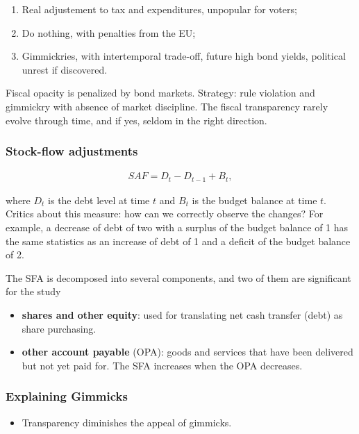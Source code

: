 \begin{enumerate}
\def\labelenumi{\arabic{enumi}.}
\itemsep1pt\parskip0pt
\item
  Real adjustement to tax and expenditures, unpopular for voters;
\item
  Do nothing, with penalties from the EU;
\item
  Gimmickries, with intertemporal trade-off, future high bond yields,
  political unrest if discovered.
\end{enumerate}

Fiscal opacity is penalized by bond markets. Strategy: rule violation
and gimmickry with absence of market discipline. The fiscal transparency
rarely evolve through time, and if yes, seldom in the right direction.

\subsubsection{Stock-flow adjustments}\label{stock-flow-adjustments}

\begin{align*}
 SAF=  D_t - D_{t-1} + B_t,
\end{align*}

where \(D_t\) is the debt level at time \(t\) and \(B_t\) is the budget
balance at time \(t\). Critics about this measure: how can we correctly
observe the changes? For example, a decrease of debt of two with a
surplus of the budget balance of 1 has the same statistics as an
increase of debt of 1 and a deficit of the budget balance of 2.

The SFA is decomposed into several components, and two of them are
significant for the study

\begin{itemize}
\item
  \textbf{shares and other equity}: used for translating net cash
  transfer (debt) as share purchasing.
\item
  \textbf{other account payable} (OPA): goods and services that have
  been delivered but not yet paid for. The SFA increases when the OPA
  decreases.
\end{itemize}

\subsubsection{Explaining Gimmicks}\label{explaining-gimmicks}

\begin{itemize}
\itemsep1pt\parskip0pt
\item
  Transparency diminishes the appeal of gimmicks.
\end{itemize}

